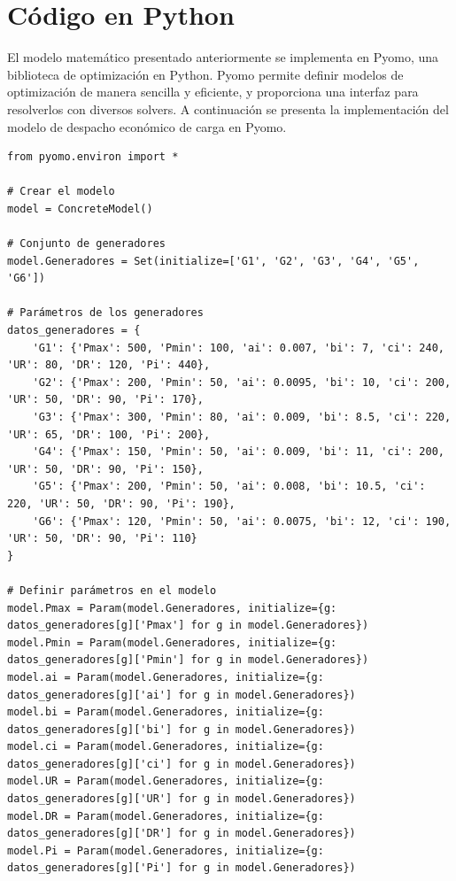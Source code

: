 \documentclass[11pt]{article}
\begin{document}
\newpage
\section{Código en Python}
El modelo matemático presentado anteriormente se implementa en Pyomo, una biblioteca de optimización en Python. Pyomo permite definir modelos de optimización de manera sencilla y eficiente, y proporciona una interfaz para resolverlos con diversos solvers. A continuación se presenta la implementación del modelo de despacho económico de carga en Pyomo.

\begin{lstlisting}[style=mypython, caption={Modelo de Despacho Económico con Pyomo}]
from pyomo.environ import *
    
# Crear el modelo
model = ConcreteModel()
    
# Conjunto de generadores
model.Generadores = Set(initialize=['G1', 'G2', 'G3', 'G4', 'G5', 'G6'])
    
# Parámetros de los generadores
datos_generadores = {
    'G1': {'Pmax': 500, 'Pmin': 100, 'ai': 0.007, 'bi': 7, 'ci': 240, 'UR': 80, 'DR': 120, 'Pi': 440},
    'G2': {'Pmax': 200, 'Pmin': 50, 'ai': 0.0095, 'bi': 10, 'ci': 200, 'UR': 50, 'DR': 90, 'Pi': 170},
    'G3': {'Pmax': 300, 'Pmin': 80, 'ai': 0.009, 'bi': 8.5, 'ci': 220, 'UR': 65, 'DR': 100, 'Pi': 200},
    'G4': {'Pmax': 150, 'Pmin': 50, 'ai': 0.009, 'bi': 11, 'ci': 200, 'UR': 50, 'DR': 90, 'Pi': 150},
    'G5': {'Pmax': 200, 'Pmin': 50, 'ai': 0.008, 'bi': 10.5, 'ci': 220, 'UR': 50, 'DR': 90, 'Pi': 190},
    'G6': {'Pmax': 120, 'Pmin': 50, 'ai': 0.0075, 'bi': 12, 'ci': 190, 'UR': 50, 'DR': 90, 'Pi': 110}
}
    
# Definir parámetros en el modelo
model.Pmax = Param(model.Generadores, initialize={g: datos_generadores[g]['Pmax'] for g in model.Generadores})
model.Pmin = Param(model.Generadores, initialize={g: datos_generadores[g]['Pmin'] for g in model.Generadores})
model.ai = Param(model.Generadores, initialize={g: datos_generadores[g]['ai'] for g in model.Generadores})
model.bi = Param(model.Generadores, initialize={g: datos_generadores[g]['bi'] for g in model.Generadores})
model.ci = Param(model.Generadores, initialize={g: datos_generadores[g]['ci'] for g in model.Generadores})
model.UR = Param(model.Generadores, initialize={g: datos_generadores[g]['UR'] for g in model.Generadores})
model.DR = Param(model.Generadores, initialize={g: datos_generadores[g]['DR'] for g in model.Generadores})
model.Pi = Param(model.Generadores, initialize={g: datos_generadores[g]['Pi'] for g in model.Generadores})
    

\end{lstlisting}
\end{document}
